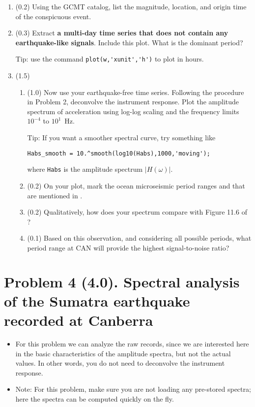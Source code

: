 \documentclass[11pt,titlepage,fleqn]{article}
\begin{document}
\begin{enumerate}
\item (0.2) Using the GCMT catalog, list the magnitude, location, and origin time of the conspicuous event. 

\item (0.3) Extract {\bf a multi-day time series that does not contain any earthquake-like signals}. Include this plot. What is the dominant period?

Tip: use the command \verb+plot(w,'xunit','h')+ to plot in hours.

\item (1.5)

\begin{enumerate}
\item (1.0) Now use your earthquake-free time series.
Following the procedure in Problem 2, deconvolve the instrument response.
Plot the amplitude spectrum of acceleration using log-log scaling and the frequency limits $10^{-4}$ to $10^1$~Hz.

Tip: If you want a smoother spectral curve, try something like

\noindent
\verb+Habs_smooth = 10.^smooth(log10(Habs),1000,'moving');+

\noindent
where \verb+Habs+ is the amplitude spectrum $|H(\omega)|$.

\item (0.2) On your plot, mark the ocean microseismic period ranges  and  that are mentioned in \citet[][Section 11.2]{ShearerE2}.

\item (0.2) Qualitatively, how does your spectrum compare with Figure 11.6 of \citet{ShearerE2}?

\item (0.1) Based on this observation, and considering all possible periods, what period range at CAN will provide the highest signal-to-noise ratio?

\end{enumerate}

\end{enumerate}


\section*{Problem 4 (4.0). Spectral analysis of the Sumatra earthquake recorded at Canberra}

\begin{itemize}
\item For this problem we can analyze the raw records, since we are interested here in the basic characteristics of the amplitude spectra, but not the actual values. In other words, you do not need to deconvolve the instrument response.

\item Note: For this problem, make sure you are not loading any pre-stored spectra; here the spectra can be computed quickly on the fly.
\end{itemize}
\end{document}
